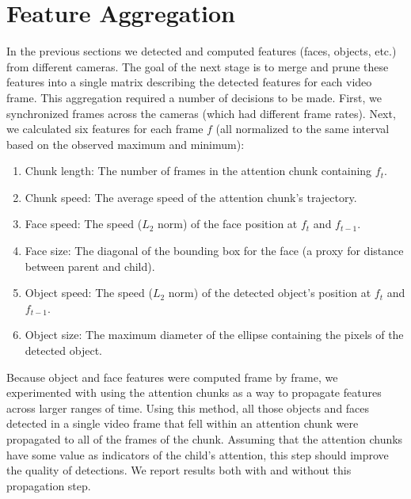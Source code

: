 \documentclass[10pt,letterpaper]{article}
\begin{document}
\section{Feature Aggregation}

In the previous sections we detected and computed features (faces, objects, etc.) from different cameras. The goal of the next stage is to merge and prune these features into a single matrix describing the detected features for each video frame. This aggregation required a number of decisions to be made. First, we synchronized frames across the cameras (which had different frame rates). Next, we calculated six features for each frame $f$ (all normalized to the same interval based on the observed maximum and minimum): 


\begin{enumerate}[noitemsep]
\item Chunk length: The number of frames in the attention chunk containing $f_{t}$.
\item Chunk speed: The average speed of the attention chunk's trajectory. 
\item Face speed: The speed ($L_{2}$ norm) of the face position at $f_t$ and $f_{t-1}$. 
\item Face size: The diagonal of the bounding box for the face (a proxy for distance between parent and child).
\item  Object speed: The speed ($L_{2}$ norm) of the detected object's position at $f_t$ and $f_{t-1}$.    
\item Object size: The maximum diameter of the ellipse containing the pixels of the detected object.
\end{enumerate}

Because object and face features were computed frame by frame, we experimented with using the attention chunks as a way to propagate features across larger ranges of time. Using this method, all those objects and faces detected in a single video frame that fell within an attention chunk were propagated to all of the frames of the chunk. Assuming that the attention chunks have some value as indicators of the child's attention, this step should improve the quality of detections. We report results both with and without this propagation step. 
\end{document}
